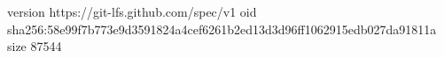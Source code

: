 version https://git-lfs.github.com/spec/v1
oid sha256:58e99f7b773e9d3591824a4cef6261b2ed13d3d96ff1062915edb027da91811a
size 87544
